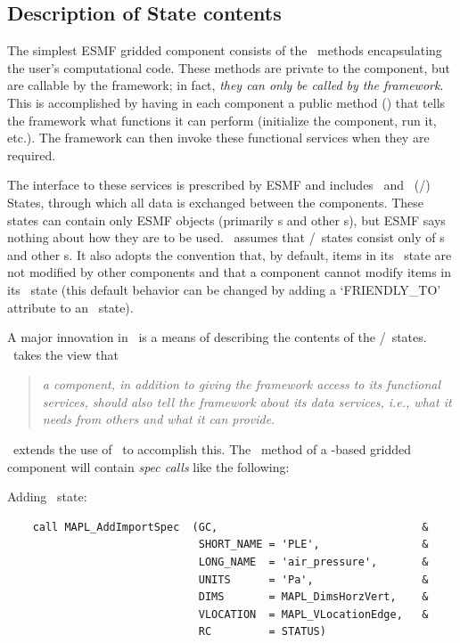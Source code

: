 \subsection{Description of State contents} \label{sec:descStContents}
The simplest ESMF gridded component consists of the
\IRF\ methods encapsulating the user's computational code. These
methods are private to the component, but are callable by the
framework; in fact, \emph{they can only be called by the framework}. This
is accomplished by having in each component a public method
(\ssv) that tells the framework what functions it can perform
(initialize the component, run it, etc.). The framework can then
invoke these functional services when they are required.

The interface to these services is prescribed by ESMF and includes
\im\ and \ex\ (\IM/\EX) States, through which all data is exchanged
between the components. These states can contain only ESMF
objects (primarily \fld s and other \stt s),  but ESMF says
nothing about how they are to be used. \ggn\ assumes that
\IM/\EX\ states consist only of \fld s and other \stt s. It also adopts
the convention that, by default, items in its \ex\ state are not
modified by other components and that a component cannot modify items in its
\im\ state (this default behavior can be changed by adding a `FRIENDLY\_TO'
attribute to an \IM\ state).

A major innovation in \ggn\ is a means of describing the
contents of the \IM/\EX\ states. \ggn\ takes the view that
\begin{quote}
\emph{a component, in addition to giving the framework access to its
functional services, should also tell the framework about its data
services, i.e., what it needs from others and what it can provide}.
\end{quote}
\ggn\ extends the use of \ssv\ to accomplish this. The
\ssv\ method of a \ggn-based gridded component will
contain {\em spec calls} like the following:

Adding \im\ state:
\begin{verbatim}
    call MAPL_AddImportSpec  (GC,                                &
                              SHORT_NAME = 'PLE',                &
                              LONG_NAME  = 'air_pressure',       &
                              UNITS      = 'Pa',                 &
                              DIMS       = MAPL_DimsHorzVert,    &
                              VLOCATION  = MAPL_VLocationEdge,   &
                              RC         = STATUS)
\end{verbatim}

